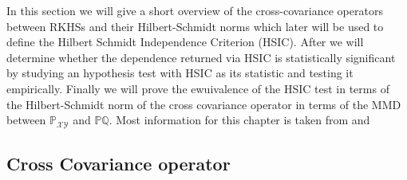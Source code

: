 
In this section we will give a short overview of the cross-covariance operators between RKHSs and their Hilbert-Schmidt norms which later will be used to define the Hilbert Schmidt Independence Criterion (HSIC).
After we will determine whether the dependence returned via HSIC is statistically significant by studying an hypothesis test with HSIC as its statistic and testing it empirically.
Finally we will prove the ewuivalence of the HSIC test in terms of the Hilbert-Schmidt norm of the cross covariance operator in terms of the MMD between $\mathbb{P}_{\mathcal{X}\mathcal{Y}}$ and $\mathbb{P}\mathbb{Q}$.
Most information for this chapter is taken from \cite{HSICdistribution} \cite{HSIC_1} and \cite{HSICDegenerate}

\subsection{Cross Covariance operator}

